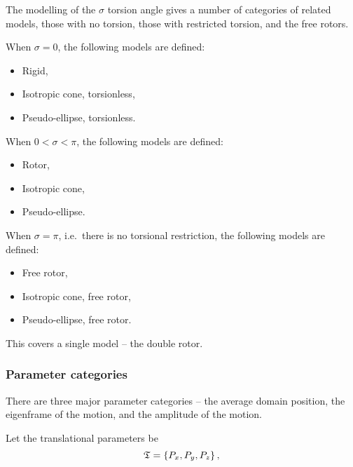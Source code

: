 The modelling of the $\sigma$ torsion angle gives a number of categories of related models, those with no torsion, those with restricted torsion, and the free rotors.



When $\sigma = 0$, the following models are defined:
\begin{itemize}
    \item Rigid,
    \item Isotropic cone, torsionless,
    \item Pseudo-ellipse, torsionless.
\end{itemize}



When $0 < \sigma < \pi$, the following models are defined:
\begin{itemize}
    \item Rotor,
    \item Isotropic cone,
    \item Pseudo-ellipse.
\end{itemize}



When $\sigma = \pi$, i.e.\ there is no torsional restriction, the following models are defined:
\begin{itemize}
    \item Free rotor,
    \item Isotropic cone, free rotor,
    \item Pseudo-ellipse, free rotor.
\end{itemize}



This covers a single model -- the double rotor.


\subsubsection{Parameter categories}

There are three major parameter categories -- the average domain position, the eigenframe of the motion, and the amplitude of the motion.



Let the translational parameters be
\begin{equation}
    \mathfrak{T} = \left\{ P_x, P_y, P_z \right\},
\end{equation}

